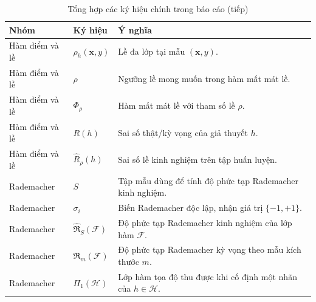 \begin{table}[H]
\centering
\small
\caption{Tổng hợp các ký hiệu chính trong báo cáo (tiếp)}
\begin{tabular}{|>{\raggedright\arraybackslash}p{3.2cm}|>{\raggedright\arraybackslash}p{4.2cm}|>{\raggedright\arraybackslash}p{6.6cm}|}
\hline
\textbf{Nhóm} & \textbf{Ký hiệu} & \textbf{Ý nghĩa} \\
\hline
Hàm điểm và lề & $\rho_h(\bm{x},y)$ & Lề đa lớp tại mẫu $(\bm{x},y)$. \\
\hline
Hàm điểm và lề & $\rho$ & Ngưỡng lề mong muốn trong hàm mất mát lề. \\
\hline
Hàm điểm và lề & $\Phi_\rho$ & Hàm mất mát lề với tham số lề $\rho$. \\
\hline
Hàm điểm và lề & $R(h)$ & Sai số thật/kỳ vọng của giả thuyết $h$. \\
\hline
Hàm điểm và lề & $\widehat{R}_\rho(h)$ & Sai số lề kinh nghiệm trên tập huấn luyện. \\
\hline
Rademacher & $S$ & Tập mẫu dùng để tính độ phức tạp Rademacher kinh nghiệm. \\
\hline
Rademacher & $\sigma_i$ & Biến Rademacher độc lập, nhận giá trị $\{-1,+1\}$. \\
\hline
Rademacher & $\widehat{\mathfrak{R}}_S(\mathcal{F})$ & Độ phức tạp Rademacher kinh nghiệm của lớp hàm $\mathcal{F}$. \\
\hline
Rademacher & $\mathfrak{R}_m(\mathcal{F})$ & Độ phức tạp Rademacher kỳ vọng theo mẫu kích thước $m$. \\
\hline
Rademacher & $\Pi_1(\mathcal{H})$ & Lớp hàm tọa độ thu được khi cố định một nhãn của $h\in\mathcal{H}$. \\
\hline
\end{tabular}
\end{table}
